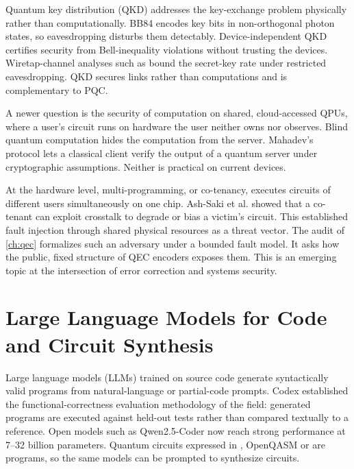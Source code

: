 Quantum key distribution (QKD) addresses the key-exchange problem physically rather than computationally. BB84 \cite{bennett1984bb84} encodes key bits in non-orthogonal photon states, so eavesdropping disturbs them detectably. Device-independent QKD \cite{vazirani2014diqkd} certifies security from Bell-inequality violations without trusting the devices. Wiretap-channel analyses such as \cite{pan2020secretkey} bound the secret-key rate under restricted eavesdropping. QKD secures links rather than computations and is complementary to PQC.

A newer question is the security of computation on shared, cloud-accessed QPUs, where a user's circuit runs on hardware the user neither owns nor observes. Blind quantum computation \cite{broadbent2009blind} hides the computation from the server. Mahadev's protocol \cite{mahadev2018verification} lets a classical client verify the output of a quantum server under cryptographic assumptions. Neither is practical on current devices.

At the hardware level, multi-programming, or co-tenancy, executes circuits of different users simultaneously on one chip. Ash-Saki et al. \cite{ashsaki2020crosstalk} showed that a co-tenant can exploit crosstalk to degrade or bias a victim's circuit. This established fault injection through shared physical resources as a threat vector. The audit of \cref{ch:qec} \cite{guo2026qecaudit} formalizes such an adversary under a bounded fault model. It asks how the public, fixed structure of QEC encoders exposes them. This is an emerging topic at the intersection of error correction and systems security.

\section{Large Language Models for Code and Circuit Synthesis}\label{sec:bg:llm}

Large language models (LLMs) trained on source code generate syntactically valid programs from natural-language or partial-code prompts. Codex \cite{chen2021codex} established the functional-correctness evaluation methodology of the field: generated programs are executed against held-out tests rather than compared textually to a reference. Open models such as Qwen2.5-Coder \cite{hui2024qwen25coder} now reach strong performance at 7--32 billion parameters. Quantum circuits expressed in \qiskit{}, OpenQASM or \cudaq{} are programs, so the same models can be prompted to synthesize circuits.


